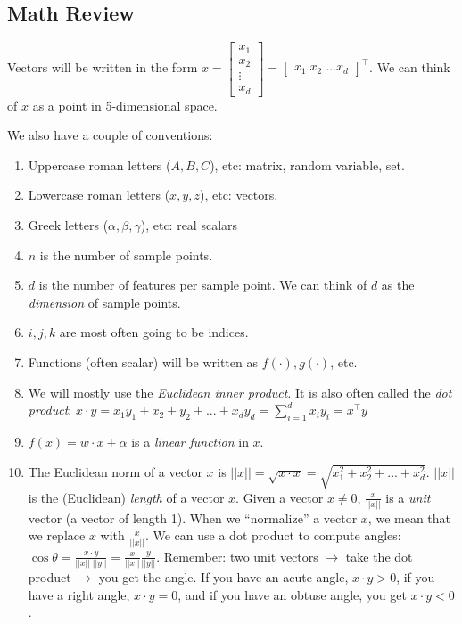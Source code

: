 \subsection{Math Review}
Vectors will be written in the form
$x = \begin{bmatrix}
    x_1 \\
    x_2 \\
    \vdots \\
    x_d
\end{bmatrix} 
= \begin{bmatrix}
    x_1 \; x_2 \; \dots x_d
\end{bmatrix}^\top.$
We can think of $x$ as a point in 5-dimensional space.

We also have a couple of conventions:

\begin{enumerate}
    \item Uppercase roman letters ($A, B, C$), etc: matrix, random variable, set.
    \item Lowercase roman letters ($x, y, z$), etc:
    vectors.
    \item Greek letters ($\alpha, \beta, \gamma$), etc: real scalars
    \item $n$ is the number of sample points.
    \item $d$ is the number of features per sample point.
    We can think of $d$ as the \textit{dimension} of sample points.
    \item $i, j, k$ are most often going to be indices.
    \item Functions (often scalar) will be written as $f(\cdot), g(\cdot)$, etc.
    \item We will mostly use the \textit{Euclidean inner product}.
    It is also often called the \textit{dot product}:
    $x \cdot y = x_1y_1 + x_2+y_2 + ... + x_dy_d = \sum_{i = 1}^d x_iy_i = x^\top y$
    \item $f(x) = w \cdot x + \alpha$ is a \textit{linear function} in $x$.
    \item The Euclidean norm of a vector $x$ is
    $||x|| = \sqrt{x\cdot x} = \sqrt{x_1^2+x_2^2+...+x_d^2}$.
    $||x||$ is the (Euclidean) \textit{length} of a vector $x$.
    Given a vector $x \neq 0$, $\frac{x}{||x||}$ is a \textit{unit} vector (a vector of length 1).
    When we ``normalize'' a vector $x$, we mean that we replace $x$ with $\frac{x}{||x||}$.
    We can use a dot product to compute angles:
    $\cos\theta  =\frac{x \cdot y}{||x|| \; ||y||} = \frac{x}{||x||} \frac{y}{||y||}$.
    Remember: two unit vectors $\rightarrow$ take the dot product $\rightarrow$ you get the angle.
    If you have an acute angle, $x \cdot y > 0$, if you have a right angle, $x \cdot y = 0$, and if you have an obtuse angle, you get $x \cdot y < 0$.
\end{enumerate}

